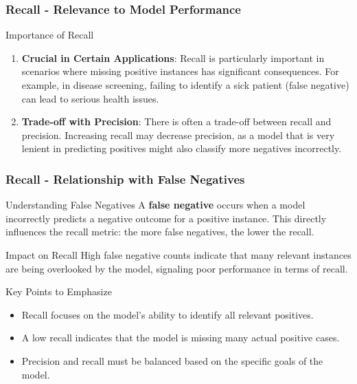 \documentclass[aspectratio=169]{beamer}
\begin{document}
\begin{frame}[fragile]
    \frametitle{Recall - Relevance to Model Performance}
    \begin{block}{Importance of Recall}
        \begin{enumerate}
            \item \textbf{Crucial in Certain Applications}: 
            Recall is particularly important in scenarios where missing positive instances has significant consequences. For example, in disease screening, failing to identify a sick patient (false negative) can lead to serious health issues.
            
            \item \textbf{Trade-off with Precision}:
            There is often a trade-off between recall and precision. Increasing recall may decrease precision, as a model that is very lenient in predicting positives might also classify more negatives incorrectly.
        \end{enumerate}
    \end{block}
\end{frame}

\begin{frame}[fragile]
    \frametitle{Recall - Relationship with False Negatives}
    \begin{block}{Understanding False Negatives}
        A \textbf{false negative} occurs when a model incorrectly predicts a negative outcome for a positive instance. This directly influences the recall metric: the more false negatives, the lower the recall.
    \end{block}

    \begin{block}{Impact on Recall}
        High false negative counts indicate that many relevant instances are being overlooked by the model, signaling poor performance in terms of recall.
    \end{block}
    
    \begin{block}{Key Points to Emphasize}
        \begin{itemize}
            \item Recall focuses on the model's ability to identify all relevant positives.
            \item A low recall indicates that the model is missing many actual positive cases.
            \item Precision and recall must be balanced based on the specific goals of the model.
        \end{itemize}
    \end{block}
\end{frame}
\end{document}

